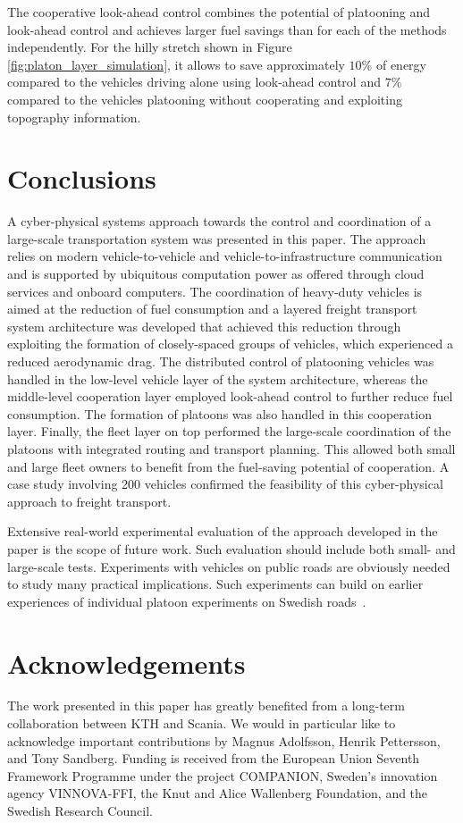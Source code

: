 \documentclass[journal]{IEEEtran}
\begin{document}
The cooperative look-ahead control combines the potential of platooning and look-ahead control and achieves larger fuel savings than for each of the methods independently. For the hilly stretch shown in Figure \ref{fig:platon_layer_simulation}, it allows to save approximately $10$\% of energy compared to the vehicles driving alone using look-ahead control and $7$\% compared to the vehicles platooning without cooperating and exploiting topography information.




\section{Conclusions}\label{sec_conclusions}
A cyber-physical systems approach towards the control and coordination of a large-scale transportation system was presented in this paper. The approach relies on modern vehicle-to-vehicle and vehicle-to-infrastructure communication and is supported by ubiquitous computation power as offered through cloud services and onboard computers. The coordination of heavy-duty vehicles is aimed at the reduction of fuel consumption and a layered freight transport system architecture was developed that achieved this reduction through exploiting the formation of closely-spaced groups of vehicles, which experienced a reduced aerodynamic drag. The distributed control of platooning vehicles was handled in the low-level vehicle layer of the system architecture, whereas the middle-level cooperation layer
employed look-ahead control to further reduce fuel consumption. The formation of platoons was also handled in this cooperation layer. Finally, the fleet layer on top performed the large-scale coordination of the platoons with integrated routing and transport planning. This allowed both small and large fleet owners to benefit from the fuel-saving potential of cooperation. A case study involving 200 vehicles confirmed the feasibility of this cyber-physical approach to freight transport.

Extensive real-world experimental evaluation of the approach developed in the paper is the scope of future work. Such evaluation should include both small- and large-scale tests. Experiments with vehicles on public roads are obviously needed to study many practical implications. Such experiments can build on earlier experiences of individual platoon experiments on Swedish roads~\cite{alam_2010,alam_2015b}.




\section*{Acknowledgements}
The work presented in this paper has greatly benefited from a long-term collaboration between KTH and Scania. We would in particular like to acknowledge important contributions by Magnus Adolfsson, Henrik Pettersson, and Tony Sandberg. Funding is received from the European Union Seventh Framework Programme under the project COMPANION, Sweden's innovation agency VINNOVA-FFI, the Knut and Alice Wallenberg Foundation, and the Swedish Research Council.






\end{document}
